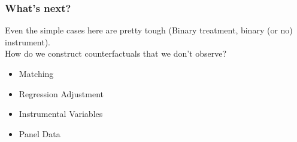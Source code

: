 \documentclass[xcolor=pdftex,dvipsnames,table,mathserif,aspectratio=169]{beamer}
\begin{document}
\begin{frame}
\frametitle{What's next?}
Even the simple cases here are pretty tough (Binary treatment, binary (or no) instrument).\\

How do we construct counterfactuals that we don't observe?
\begin{itemize}
\item Matching
\item Regression Adjustment
\item Instrumental Variables
\item Panel Data
\end{itemize}
\end{frame}
\end{document}
